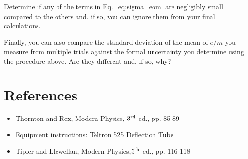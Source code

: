 \documentclass{tufte-handout}
\begin{document}
Determine if any of the terms in Eq.~\ref{eq:sigma_eom} are negligibly small
compared to the others and, if so, you can ignore them from your final
calculations. 

Finally, you can also compare the standard deviation of the mean of $e/m$ you
measure from multiple trials against the formal uncertainty you determine using
the procedure above. Are they different and, if so, why?


\section{References}
\begin{itemize}
\item Thornton and Rex, Modern Physics, $3^{\rm rd}$ ed., pp. 85-89
\item Equipment instructions: Teltron 525 Deflection Tube
\item Tipler and Llewellan, Modern Physics,$5^{\rm th}$ ed., pp. 116-118
\end{itemize}
\end{document}
